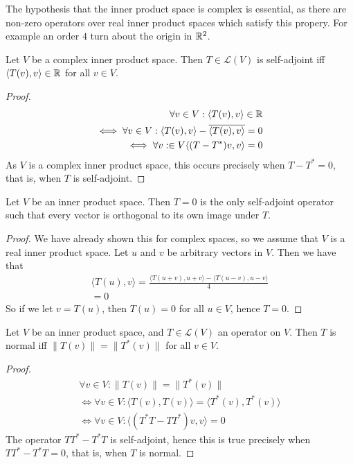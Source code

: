 \documentclass[]{article}
\begin{document}
The hypothesis that the inner product space is complex is essential, as there are non-zero operators over real inner product spaces which satisfy this propery. For example an order $4$ turn about the origin in $\mathbb{R}^2$.

\begin{thm}
		Let $V$ be a complex inner product space. Then $T \in \mathcal{L}(V)$ is self-adjoint iff $\langle T(v), v \rangle \in \mathbb{R}$ for all $v \in V$.
\end{thm}

\begin{proof}
		\begin{align*}
				\forall v \in V: \langle T(v), v \rangle \in \mathbb{R} \\
				\iff \forall v \in V: \langle T(v), v \rangle - \overline{\langle T(v), v \rangle } = 0 \\
				\iff \forall v: \in V \langle (T-T^*)v, v \rangle = 0
		\end{align*}
		As $V$ is a complex inner product space, this occurs precisely when $T-T^*=0$, that is, when $T$ is self-adjoint.
\end{proof}

\begin{thm}
	Let $V$ be an inner product space. Then $T = 0$ is the only self-adjoint operator such that every vector is orthogonal to its own image under $T$.
\end{thm}

\begin{proof}
	We have already shown this for complex spaces, so we assume that $V$ is a real inner product space. Let $u$ and $v$ be arbitrary vectors in $V$. Then we have that
	\begin{align*}
			\langle T(u), v \rangle = \frac{\langle T(u+v), u+v \rangle - \langle T(u-v), u-v \rangle }{4} \\
			= 0
	\end{align*}
	So if we let $v = T(u)$, then $T(u) = 0$ for all $u \in V$, hence $T = 0$.
\end{proof}

\begin{thm}
		Let $V$ be an inner product space, and $T \in \mathcal{L}(V)$ an operator on $V$. Then $T$ is normal iff $\|T(v)\| = \|T^*(v)\|$ for all $v \in V$.
\end{thm}

\begin{proof}
		\begin{align*}
				\forall v \in V: \|T(v)\| = \|T^*(v)\| \\	
				\iff \forall v \in V: \langle T(v), T(v) \rangle = \langle T^*(v), T^*(v) \rangle \\
						\iff \forall v \in V: \langle (T^*T - TT^*)v, v \rangle = 0
		\end{align*}
		The operator $TT^* - T^*T$ is self-adjoint, hence this is true precisely when $TT^* - T^*T = 0$, that is, when $T$ is normal.
\end{proof}
\end{document}
